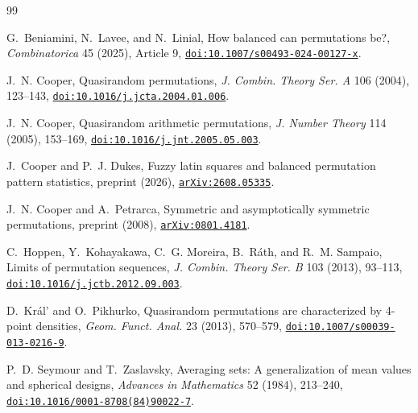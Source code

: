 \documentclass[11pt,letterpaper]{article}
\begin{document}
\begin{thebibliography}{99}
\small
\setlength{\emergencystretch}{2em}
\setlength{\itemsep}{0pt}

G.~Beniamini, N.~Lavee, and N.~Linial,
\newblock How balanced can permutations be?,
\newblock \emph{Combinatorica} 45 (2025), Article 9,
\newblock \href{https://doi.org/10.1007/s00493-024-00127-x}
 {\texttt{doi:10.1007/s00493-024-00127-x}}.

J.~N. Cooper,
\newblock Quasirandom permutations,
\newblock \emph{J. Combin. Theory Ser. A} 106 (2004), 123--143,
\newblock \href{https://doi.org/10.1016/j.jcta.2004.01.006}
 {\texttt{doi:10.1016/j.jcta.2004.01.006}}.

J.~N. Cooper,
\newblock Quasirandom arithmetic permutations,
\newblock \emph{J. Number Theory} 114 (2005), 153--169,
\newblock \href{https://doi.org/10.1016/j.jnt.2005.05.003}
 {\texttt{doi:10.1016/j.jnt.2005.05.003}}.

J.~Cooper and P.~J. Dukes,
\newblock Fuzzy latin squares and balanced permutation pattern statistics,
\newblock preprint (2026),
\newblock \href{https://arxiv.org/abs/2608.05335}
 {\texttt{arXiv:2608.05335}}.

J.~N. Cooper and A.~Petrarca,
\newblock Symmetric and asymptotically symmetric permutations,
\newblock preprint (2008),
\newblock \href{https://arxiv.org/abs/0801.4181}
 {\texttt{arXiv:0801.4181}}.

C.~Hoppen, Y.~Kohayakawa, C.~G. Moreira, B.~R\'ath, and
R.~M. Sampaio,
\newblock Limits of permutation sequences,
\newblock \emph{J. Combin. Theory Ser. B} 103 (2013), 93--113,
\newblock \href{https://doi.org/10.1016/j.jctb.2012.09.003}
 {\texttt{doi:10.1016/j.jctb.2012.09.003}}.

D.~Kr\'al' and O.~Pikhurko,
\newblock Quasirandom permutations are characterized by 4-point densities,
\newblock \emph{Geom. Funct. Anal.} 23 (2013), 570--579,
\newblock \href{https://doi.org/10.1007/s00039-013-0216-9}
 {\texttt{doi:10.1007/s00039-013-0216-9}}.

P.~D. Seymour and T.~Zaslavsky,
\newblock Averaging sets: A generalization of mean values and spherical designs,
\newblock \emph{Advances in Mathematics} 52 (1984), 213--240,
\newblock \href{https://doi.org/10.1016/0001-8708(84)90022-7}
 {\texttt{doi:10.1016/0001-8708(84)90022-7}}.

\end{thebibliography}
\end{document}
